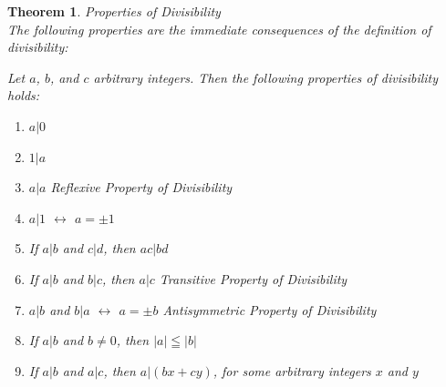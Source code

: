 \documentclass{book}
\newtheorem{theorem}{Theorem}[section]
\theoremstyle{definition}
\theoremstyle{remark}
\begin{document}
\begin{theorem}
Properties of Divisibility \\

The following properties are the immediate consequences of the definition of divisibility:

	\begin{tcolorbox}	
		Let $a$, $b$, and $c$ arbitrary integers. Then the following properties of divisibility holds:
		\begin{enumerate}
		    \item $a | 0$
		    
		    \item $1 | a$
		    
		    \item $a | a$ \textit{Reflexive Property of Divisibility} 
		    
		    \item  $a | 1$ $\leftrightarrow$ $a = \pm 1$
		    
		    \item If $a | b$ and $c | d$, then $ac | bd$
		    
		    \item If $a | b$ and $b | c$, then $a | c$ \textit{Transitive Property of Divisibility}
		    
		    \item $a | b$ and $b | a$ $\leftrightarrow$ $a = \pm b$ \textit{Antisymmetric Property of Divisibility}
		    
		    \item If $a | b$ and $b \neq 0$, then $|a| \leqq |b|$
		    
		    \item If $a | b$ and $a | c$, then $a | (bx + cy)$, for some arbitrary integers $x$ and $y$
		\end{enumerate}
    \end{tcolorbox}
\end{theorem}
\end{document}
